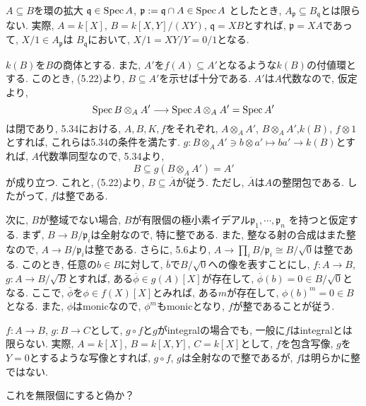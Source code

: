 \documentclass[dvipdfmx]{jsarticle}
\begin{document}
    \begin{note}
        $A \subseteq B$を環の拡大
        $\mathfrak{q} \in \operatorname{Spec}{A}$, $\mathfrak{p}:= \mathfrak{q} \cap A \in \operatorname{Spec}{A}$
        としたとき,
        $A_\mathfrak{p} \subseteq B_\mathfrak{q}$とは限らない.
        実際, $A = k[X]$, $B = k[X,Y]/(XY)$, $\mathfrak{q} = XB$とすれば,
        $\mathfrak{p} = XA$であって,
        $X/1 \in A_\mathfrak{p}$は
        $B_\mathfrak{q}$において, $X/1 = XY/Y = 0/1$となる.
    \end{note}

    \begin{problem}
        $k(B)$を$B$の商体とする.
        また, $A'$を$f(A) \subseteq A'$となるような$k(B)$の付値環とする.
        このとき, (5.22)より, $B \subseteq A'$を示せば十分である.
        $A'$は$A$代数なので, 仮定より,
        \[
            \operatorname{Spec}{B \otimes_A A'} \longrightarrow \operatorname{Spec}{A\otimes_A A'} = \operatorname{Spec}{A'}
        \]
        は閉であり,
        5.34における, $A,B,K,f$をそれぞれ, $A\otimes_A A'$, $B\otimes_A A'$,$k(B)$, $f\otimes 1$とすれば,
        これらは5.34の条件を満たす.
        $g: B\otimes_A A' \ni b\otimes a' \mapsto ba' \to k(B)$とすれば,
        $A$代数準同型なので, 5.34より,
        \[
            B \subseteq g(B \otimes_A A') =A'
        \]
        が成り立つ.
        これと, (5.22)より,
        $B \subseteq \overline{A}$が従う.
        ただし, $\overline{A}$は$A$の整閉包である.
        したがって, $f$は整である.

        次に, $B$が整域でない場合, $B$が有限個の極小素イデアル$\mathfrak{p}_1, \cdots, \mathfrak{p}_n$
        を持つと仮定する.
        まず, $B \to B/\mathfrak{p}_i$は全射なので, 特に整である.
        また, 整なる射の合成はまた整なので, $A \to B/\mathfrak{p}_i$は整である.
        さらに, 5.6より, $A \to \prod_{i} B/\mathfrak{p}_i \cong B/\sqrt{0}$は整である.
        このとき, 任意の$b \in B$に対して, $\overline{b}$で$B/\sqrt{0}$への像を表すことにし, 
        $f: A \to B$, $g: A \to B/\sqrt{B}$とすれば, 
        ある$\overline{\phi} \in g(A)[X]$が存在して, $\overline{\phi}(b) = 0 \in B/\sqrt{0}$となる.
        ここで, $\overline{\phi}$を$\phi \in f(X)[X]$とみれば, ある$m$が存在して, $\phi(b)^m = 0 \in B$となる.
        また, $\phi$はmonicなので, $\phi^m$もmonicとなり, $f$が整であることが従う.
    \end{problem}

    \begin{note}
        $f: A \to B$, $g: B \to C$として, 
        $g\circ f$と$g$がintegralの場合でも, 一般に$f$はintegralとは限らない.
        実際, $A = k[X]$, $B = k[X,Y]$, $C = k[X]$として,
        $f$を包含写像, $g$を$Y = 0$とするような写像とすれば, 
        $g\circ f$, $g$は全射なので整であるが, $f$は明らかに整ではない.
    \end{note}
    \begin{note}
        これを無限個にすると偽か？
    \end{note}
\end{document}
